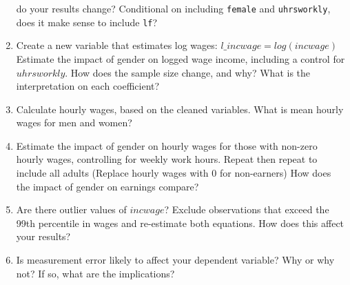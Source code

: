 \documentclass[11pt]{article}
\begin{document}
\begin{enumerate}
  do your results change? Conditional on including \texttt{female} and
  \texttt{uhrsworkly}, does it make sense to include \texttt{lf}?
\item
 Create a new variable that estimates log wages: $l\_incwage = log(incwage)$ Estimate the impact of gender on logged wage income, including a control for $uhrsworkly$. How does the sample size change, and why? What is the interpretation on each coefficient?
\item
  Calculate hourly wages, based on the cleaned variables. What is mean
  hourly wages for men and women?
\item
  Estimate the impact of gender on hourly wages for those with non-zero
  hourly wages, controlling for weekly work hours. Repeat then repeat to
  include all adults (Replace hourly wages with 0 for non-earners) How
  does the impact of gender on earnings compare?
\item
  Are there outlier values of $incwage$? Exclude observations that exceed the 99th  percentile in wages and re-estimate both equations. How does this
  affect your results?
\item
  Is measurement error likely to affect your dependent variable? Why or
  why not? If so, what are the implications?
\end{enumerate}
\end{document}
